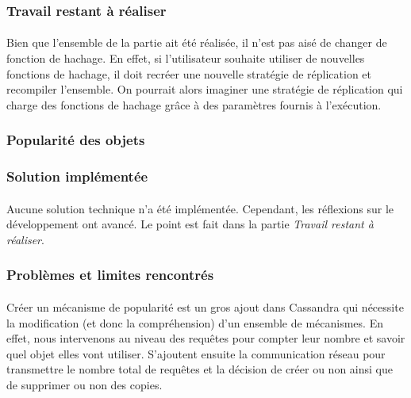 \documentclass[12pt]{article}
\begin{document}
\subsubsection*{Travail restant à réaliser}

\paragraph{}Bien que l'ensemble de la partie ait été réalisée, il n'est pas aisé de changer de fonction de hachage. En effet, si l'utilisateur souhaite utiliser de nouvelles fonctions de hachage, il doit recréer une nouvelle stratégie de réplication et recompiler l'ensemble. On pourrait alors imaginer une stratégie de réplication qui charge des fonctions de hachage grâce à des paramètres fournis à l'exécution.

\subsubsection{Popularité des objets}

\subsubsection*{Solution implémentée}

\paragraph{}Aucune solution technique n'a été implémentée. Cependant, les réflexions sur le développement ont avancé. Le point est fait dans la partie \textit{Travail restant à réaliser}.

\subsubsection*{Problèmes et limites rencontrés}

\paragraph{}Créer un mécanisme de popularité est un gros ajout dans Cassandra qui nécessite la modification (et donc la compréhension) d'un ensemble de mécanismes. En effet, nous intervenons au niveau des requêtes pour compter leur nombre et savoir quel objet elles vont utiliser. S'ajoutent ensuite la communication réseau pour transmettre le nombre total de requêtes et la décision de créer ou non ainsi que de supprimer ou non des copies.
\end{document}
